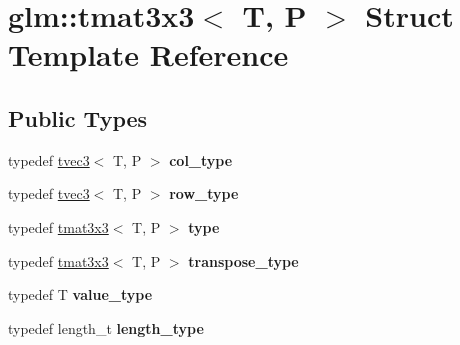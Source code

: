 \hypertarget{structglm_1_1tmat3x3}{}\section{glm\+:\+:tmat3x3$<$ T, P $>$ Struct Template Reference}
\label{structglm_1_1tmat3x3}
\subsection*{Public Types}
\begin{DoxyCompactItemize}
\item 
\mbox{\label{structglm_1_1tmat3x3_a0b80bddb3cb4e01aa04d1c7a5a47365a}} 
typedef \hyperlink{structglm_1_1tvec3}{tvec3}$<$ T, P $>$ {\bfseries col\+\_\+type}
\item 
\mbox{\label{structglm_1_1tmat3x3_a98418fd5ee5f7d505a08b913086d8d25}} 
typedef \hyperlink{structglm_1_1tvec3}{tvec3}$<$ T, P $>$ {\bfseries row\+\_\+type}
\item 
\mbox{\label{structglm_1_1tmat3x3_a0c427c28a6ca62343de768023cd69bf4}} 
typedef \hyperlink{structglm_1_1tmat3x3}{tmat3x3}$<$ T, P $>$ {\bfseries type}
\item 
\mbox{\label{structglm_1_1tmat3x3_ac27e769fb5ed861068079f433a1d5b8f}} 
typedef \hyperlink{structglm_1_1tmat3x3}{tmat3x3}$<$ T, P $>$ {\bfseries transpose\+\_\+type}
\item 
\mbox{\label{structglm_1_1tmat3x3_a90013767ff8a88d1ec5dd54574579669}} 
typedef T {\bfseries value\+\_\+type}
\item 
\mbox{\label{structglm_1_1tmat3x3_a78fa6e6e406213fa0049b5125b2686b5}} 
typedef length\+\_\+t {\bfseries length\+\_\+type}
\end{DoxyCompactItemize}

